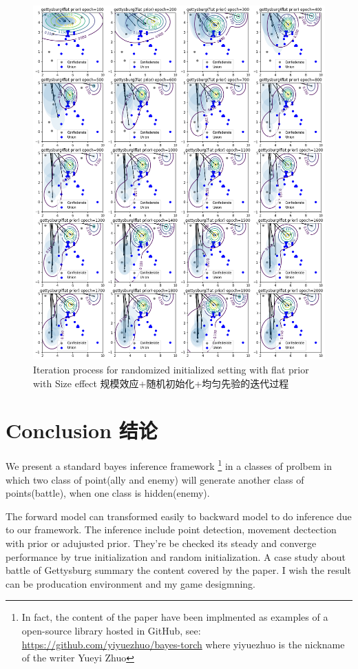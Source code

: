 \documentclass{article}
\begin{document}
\begin{figure}[ht]
\includegraphics[width=0.99\linewidth]{gettysburg-init2.png}
\caption{Iteration process for randomized initialized setting with flat prior with Size effect
规模效应+随机初始化+均匀先验的迭代过程}
\label{fig:gettysburgInitTwo}
\end{figure}


\section{Conclusion 结论}

We present a standard bayes inference framework 
\footnote{In fact, the content of the paper have been implmented as examples of a open-source library
hosted in GitHub, see: \url{https://github.com/yiyuezhuo/bayes-torch} where yiyuezhuo is the nickname of
the writer Yueyi Zhuo} 
in a classes of prolbem in which 
two class of point(ally and enemy) will generate another class of points(battle), 
when one class is hidden(enemy).

The forward model can transformed easily to backward model to do inference due to our framework.
The inference include point detection, movement dectection with prior or adujusted prior.
They're be checked its steady and converge performance by true initialization and random initialization.
A case study about battle of Gettysburg summary the content covered by the paper. 
I wish the result can be producation environment and my game desigmning.
\end{document}
